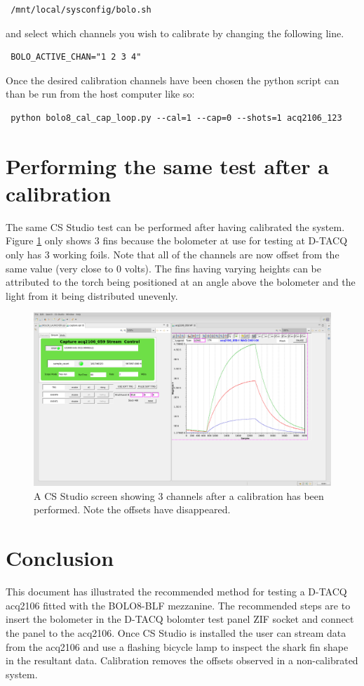\documentclass{article}
\begin{document}
\begin{verbatim} /mnt/local/sysconfig/bolo.sh \end{verbatim}

and select which channels you wish to calibrate by changing the following line.

\begin{verbatim} BOLO_ACTIVE_CHAN="1 2 3 4" \end{verbatim}

Once the desired calibration channels have been chosen the python script can than be run from the host computer like so:

\begin{verbatim} python bolo8_cal_cap_loop.py --cal=1 --cap=0 --shots=1 acq2106_123\end{verbatim}

\newpage

\section{Performing the same test after a calibration}
The same CS Studio test can be performed after having calibrated the system.
Figure \ref{3fincal} only shows 3 fins because the bolometer at use for testing at D-TACQ only has 3 working foils.
Note that all of the channels are now offset from the same value (very close to 0 volts).
The fins having varying heights can be attributed to the torch being positioned at an angle above the bolometer and the light from it being distributed unevenly.

\begin{figure}
	\centering
	\includegraphics[width=5.0in]{images/3-fin-cal.png}
	\caption{A CS Studio screen showing 3 channels after a calibration has been performed. Note the offsets have disappeared.}
	\label{3fincal}
\end{figure}


\section{Conclusion}
This document has illustrated the recommended method for testing a D-TACQ acq2106 fitted with the BOLO8-BLF mezzanine.
The recommended steps are to insert the bolometer in the D-TACQ bolomter test panel ZIF socket and connect the panel to the acq2106.
Once CS Studio is installed the user can stream data from the acq2106 and use a flashing bicycle lamp to inspect the shark fin shape in the resultant data. Calibration removes the offsets observed in a non-calibrated system. 
\end{document}
